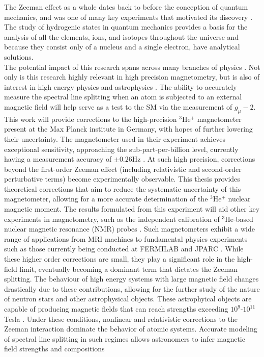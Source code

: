         The Zeeman effect as a whole dates back to before the conception of quantum mechanics, and was one of many key experiments that motivated its discovery \cite{Epstein_1926}. The study of hydrogenic states in quantum mechanics provides a basis for the analysis of all the elements, ions, and isotopes throughout the universe and because they consist only of a nucleus and a single electron, have analytical solutions.\\

        The potential impact of this research spans across many branches of physics \cite{Farooq_Chupp_Grange_Tewsley-Booth_Flay_Kawall_Sachdeva_Winter_2020,Schneider_Sikora_Dickopf_Müller_Oreshkina_Rischka_Valuev_Ulmer_Walz_Harman_et_al._2022}. Not only is this research highly relevant in high precision magnetometry, but is also of interest in high energy physics and astrophysics \cite{Farooq_Chupp_Grange_Tewsley-Booth_Flay_Kawall_Sachdeva_Winter_2020}. The ability to accurately measure the spectral line splitting when an atom is subjected to an external magnetic field will help serve as a test to the SM via the measurement of $g_\mu - 2$. This work will provide corrections to the high-precision $^3$He$^+$ magnetometer present at the Max Planck institute in Germany, with hopes of further lowering their uncertainty. The magnetometer used in their experiment achieves exceptional sensitivity, approaching the sub-part-per-billion level, currently having a measurement accuracy of $\pm 0.26$Hz \cite{Schneider_Sikora_Dickopf_Müller_Oreshkina_Rischka_Valuev_Ulmer_Walz_Harman_et_al._2022}. At such high precision, corrections beyond the first-order Zeeman effect (including relativistic and second-order perturbative terms) become experimentally observable. This thesis provides theoretical corrections that aim to reduce the systematic uncertainty of this magnetometer, allowing for a more accurate determination of the $^3$He$^+$ nuclear magnetic moment. The results formulated from this experiment will aid other key experiments in magnetometry, such as the independent calibration of $^3$He-based nuclear magnetic resonance (NMR) probes \cite{Farooq_Chupp_Grange_Tewsley-Booth_Flay_Kawall_Sachdeva_Winter_2020}. Such magnetometers exhibit a wide range of applications from MRI machines \cite{Savukov_Zotev_Volegov_Espy_Matlashov_Gomez_Kraus_2009} to fundamental physics experiments such as those currently being conducted at FERMILAB and JPARC \cite{Kim_2024, Iinuma_J-PARC}. While these higher order corrections are small, they play a significant role in the high-field limit, eventually becoming a dominant term that dictates the Zeeman splitting. The behaviour of high energy systems with large magnetic field changes drastically due to these contributions, allowing for the further study of the nature of neutron stars and other astrophysical objects. These astrophyical objects are capable of producing magnetic fields that can reach strengths exceeding $10^9$-$10^{11}$ Tesla \cite{Reisenegger_2001}. Under these conditions, nonlinear and relativistic corrections to the Zeeman interaction dominate the behavior of atomic systems. Accurate modeling of spectral line splitting in such regimes allows astronomers to infer magnetic field strengths and compositions 
